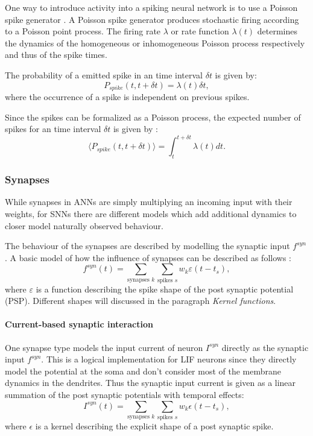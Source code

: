 One way to introduce activity into a spiking neural network is to use a Poisson spike generator \cite{Heeger2000}.
A Poisson spike generator produces stochastic firing according to a Poisson point process.
The firing rate $\lambda$ or rate function $\lambda(t)$ determines the dynamics of the homogeneous or inhomogeneous Poisson process respectively and thus of the spike times.   

The probability of a emitted spike in an time interval $\delta t$ is given by: 
\[
P_{spike}({t , t+ \delta t}) = \lambda(t) \delta t,
\]
where the occurrence of a spike is independent on previous spikes. 

Since the spikes can be formalized as a Poisson process, the expected number of spikes for an time interval $\delta t$ is given by :
\[
\langle  P_{spike}({t , t+ \delta t}) \rangle = \int_t^{t + \delta t} \lambda(t) dt.
\]


\subsubsection{Synapses}

While synapses in ANNs are simply multiplying an incoming input with their weights, for SNNs there are different models which add additional dynamics to closer model naturally observed behaviour. 

The behaviour of the synapses are described by modelling the synaptic input $f^{syn}$. A basic model of how the influence of synapses can be described as follows \cite{Petrovici2016}:
\[
f^{syn}(t) = \sum_{\text{synapses } k } \sum_{\text{spikes } s} w_k \varepsilon(t - t_s),
\]
where $\varepsilon$ is a function describing the spike shape of the post synaptic potential (PSP).
Different shapes will discussed in the paragraph \textit{Kernel functions}.

\paragraph{Current-based synaptic interaction} 
One synapse type models the input current of neuron $I^{syn}$ directly as the synaptic input $f^{syn}$. This is a logical implementation for LIF neurons since they directly model the potential at the soma and don't consider most of the membrane dynamics in the dendrites. 
Thus the synaptic input current is given as a linear summation of the post synaptic potentials with temporal effects:
\[
I^{syn}(t) = \sum_{\text{synapses } k } \sum_{\text{spikes } s} w_k \epsilon(t - t_s),
\]
where $\epsilon$ is a kernel describing the explicit shape of a post synaptic spike.

